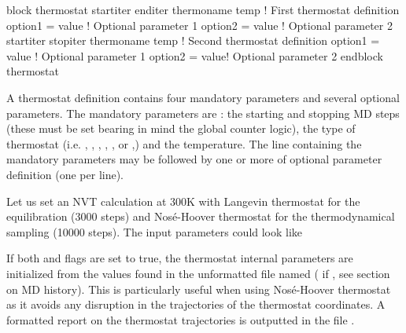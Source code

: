 \documentclass[letterpaper,10pt,english]{sphinxmanual}
\begin{document}
%
\begin{sphinxVerbatim}[commandchars=\\\{\}]
\PYGZpc{}block thermostat
  start\PYGZus{}iter \PYGZam{} end\PYGZus{}iter \PYGZam{} thermo\PYGZus{}name \PYGZam{} temp \PYGZam{} ! First thermostat definition
      option\PYGZus{}1 = value ! Optional parameter 1
      option\PYGZus{}2 = value ! Optional parameter 2
  start\PYGZus{}iter \PYGZam{} stop\PYGZus{}iter \PYGZam{} thermo\PYGZus{}name \PYGZam{} temp \PYGZam{} ! Second thermostat definition
      option\PYGZus{}1 = value ! Optional parameter 1
      option\PYGZus{}2 = value! Optional parameter 2
\PYGZpc{}endblock thermostat
\end{sphinxVerbatim}

A thermostat definition contains four mandatory parameters and several
optional parameters. The mandatory parameters are : the starting and
stopping MD steps (these must be set bearing in mind the global counter
logic), the type of thermostat (i.e. , ,
, , , or ,) and the
temperature. The line containing the mandatory parameters may be
followed by one or more of optional parameter definition (one per line).

Let us set an NVT calculation at 300K with Langevin thermostat for the
equilibration (3000 steps) and Nosé-Hoover thermostat for the
thermodynamical sampling (10000 steps). The input parameters could look
like

%
\begin{sphinxVerbatim}[commandchars=\\\{\}]
 
       
     
       
     
     
     
 
\end{sphinxVerbatim}

If both  and  flags are set to true,
the thermostat internal parameters are initialized from the values found
in the unformatted file named
( if ,
see section on MD history). This is particularly useful when using
Nosé-Hoover thermostat as it avoids any disruption in the trajectories
of the thermostat coordinates. A formatted report on the thermostat
trajectories is outputted in the file .
\end{document}
